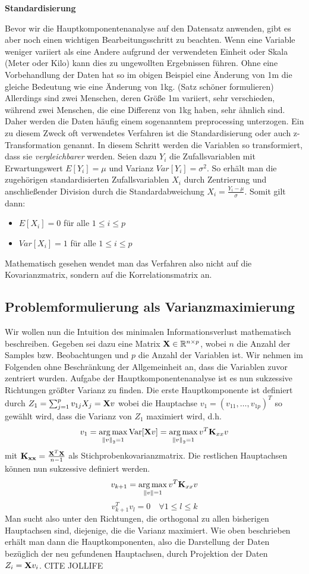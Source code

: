 \textbf{Standardisierung}

Bevor wir die Hauptkomponentenanalyse auf den Datensatz anwenden, gibt es aber noch einen wichtigen Bearbeitungsschritt zu beachten. Wenn eine Variable weniger variiert als eine Andere aufgrund der verwendeten Einheit oder Skala (Meter oder Kilo) kann dies zu ungewollten Ergebnissen führen. Ohne eine Vorbehandlung der Daten hat so im obigen Beispiel eine Änderung von 1m die gleiche Bedeutung wie eine Änderung von 1kg. (Satz schöner formulieren) Allerdings sind zwei Menschen, deren Größe 1m variiert, sehr verschieden, während zwei Menschen, die eine Differenz von 1kg haben, sehr ähnlich sind. Daher werden die Daten häufig einem sogenanntem preprocessing unterzogen. Ein zu diesem Zweck oft verwendetes Verfahren ist die Standardisierung oder auch z-Transformation genannt. In diesem Schritt werden die Variablen so transformiert, dass sie \textit{vergleichbarer} werden. Seien dazu $Y_i$ die Zufallsvariablen mit Erwartungswert $E[Y_i] = \mu$ und Varianz $Var[Y_i] = \sigma^2$. So erhält man die zugehörigen standardisierten Zufallsvariablen $X_i$ durch Zentrierung und anschließender Division durch die Standardabweichung $X_i = \frac{Y_i - \mu}{\sigma}$. Somit gilt dann:
\begin{itemize}
\item $E[X_i] = 0$ für alle $1 \leq i \leq p$
\item $Var[X_i] = 1$ für alle $1 \leq i \leq p$
\end{itemize}

Mathematisch gesehen wendet man das Verfahren also nicht auf die Kovarianzmatrix, sondern auf die Korrelationsmatrix an.

\subsection{Problemformulierung als Varianzmaximierung}

Wir wollen nun die Intuition des minimalen Informationsverlust mathematisch beschreiben. Gegeben sei dazu eine Matrix $\mathbf{X} \in \mathbb{R}^{n\times p}$, wobei $n$ die Anzahl der Samples bzw. Beobachtungen und $p$ die Anzahl der Variablen ist. Wir nehmen im Folgenden ohne Beschränkung der Allgemeinheit an, dass die Variablen zuvor zentriert wurden. Aufgabe der Hauptkomponentenanalyse ist es nun sukzessive Richtungen größter Varianz zu finden. Die erste Hauptkomponente ist definiert durch $Z_1 = \sum_{j=1}^p v_{1j}X_j = \mathbf{X}v$ wobei die Hauptachse $v_1 = (v_{11}, \ldots, v_{1p})^T$ so gewählt wird, dass die Varianz von $Z_1$ maximiert wird, d.h.
$$v_1 = \operatorname*{arg\,max}_{\left\lVert v \right\rVert_2 = 1} \text{Var}[\mathbf{X}v] = \operatorname*{arg\,max}_{\left\lVert v \right\rVert_2 = 1} v^T \mathbf{K}_{xx} v$$
mit $\mathbf{K_{xx}} = \frac{\mathbf{X}^T\mathbf{X}}{n-1}$ als Stichprobenkovarianzmatrix. Die restlichen Hauptachsen können nun sukzessive definiert werden.
$$v_{k+1} = \operatorname*{arg\,max}_{\left\lVert v \right\rVert = 1} v^T \mathbf{K}_{xx} v$$ 
$$v_{k+1}^Tv_l = 0 \quad \forall 1 \leq l \leq k$$
Man sucht also unter den Richtungen, die orthogonal zu allen bisherigen Hauptachsen sind, diejenige, die die Varianz maximiert. Wie oben beschrieben erhält man dann die Hauptkomponenten, also die Darstellung der Daten bezüglich der neu gefundenen Hauptachsen, durch Projektion der Daten $Z_i = \mathbf{X}v_i$.
\cite{zou_overview}
CITE JOLLIFE

